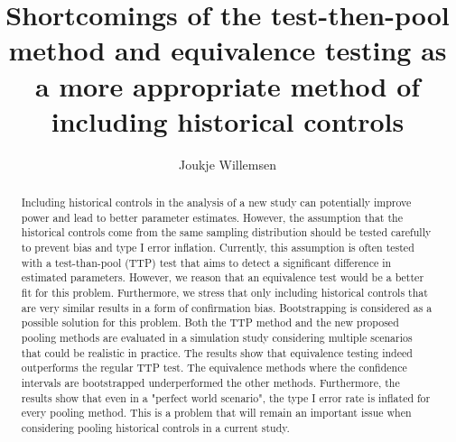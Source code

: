 \documentclass[Royal,sagev,times]{sagej}
\begin{document}
\newpage 

% 


\title{Shortcomings of the test-then-pool method and equivalence testing as a more appropriate method of including historical controls}


\author{Joukje Willemsen }%

\\


\begin{abstract}
Including historical controls in the analysis of a new study can potentially improve power and lead to better parameter estimates. However, the assumption that the historical controls come from the same sampling distribution should be tested carefully to prevent bias and type I error inflation. Currently, this assumption is often tested with a test-than-pool (TTP) test that aims to detect a significant difference in estimated parameters. However, we reason that an equivalence test would be a better fit for this problem. Furthermore, we stress that only including historical controls that are very similar results in a form of confirmation bias. Bootstrapping is considered as a possible solution for this problem. Both the TTP method and the new proposed pooling methods are evaluated in a simulation study considering multiple scenarios that could be realistic in practice. The results show that equivalence testing indeed outperforms the regular TTP test. The equivalence methods where the confidence intervals are bootstrapped underperformed the other methods. Furthermore, the results show that even in a "perfect world scenario", the type I error rate is inflated for every pooling method. This is a problem that will remain an important issue when considering pooling historical controls in a current study.  
\end{abstract}

\end{document}
